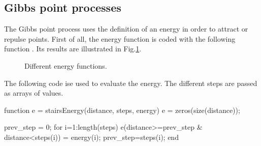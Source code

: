\subsection{Gibbs point processes}
The Gibbs point process uses the definition of an energy in order to attract or repulse points.
First of all, the energy function is coded with the following function . Its results are illustrated in Fig.\ref{fig:point_process_generation:matlab:energyfunction}.
\begin{figure}[ htbp ]
 \centering
 \hfill
 \hfill
 \caption{Different energy functions.}
 \label{fig:point_process_generation:matlab:energyfunction}
\end{figure}

The following code ise used to evaluate the energy. The different steps are passed as arrays of values.
\begin{matlab}
function e = stairsEnergy(distance, steps, energy)
e = zeros(size(distance));

prev_step = 0;
for i=1:length(steps)
    e(distance>=prev_step & distance<steps(i)) = energy(i);
    prev_step=steps(i);
end
\end{matlab}

